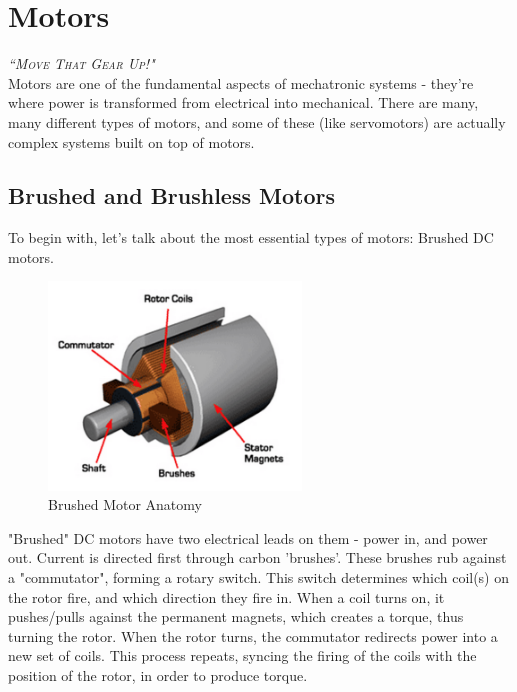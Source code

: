 \documentclass[10pt,letterpaper]{book}
\begin{document}
\chapter{Motors}
 {\slshape \scshape ``Move That Gear Up!"}
 \\
 
 Motors are one of the fundamental aspects of mechatronic systems - they're where power is transformed from electrical into mechanical. There are many, many different types of motors, and some of these (like servomotors) are actually complex systems built on top of motors.

\section{Brushed and Brushless Motors}

To begin with, let's talk about the most essential types of motors: Brushed DC motors.

\begin{figure}[H]\centering
\includegraphics[width=0.6\textwidth]{img_Mechatronics_Motors_brushed.png}
\caption{Brushed Motor Anatomy}
\end{figure}

"Brushed" DC motors have two electrical leads on them - power in, and power out. Current is directed first through carbon 'brushes'. These brushes rub against a "commutator", forming a rotary switch. This switch determines which coil(s) on the rotor fire, and which direction they fire in. When a coil turns on, it pushes/pulls against the permanent magnets, which creates a torque, thus turning the rotor. When the rotor turns, the commutator redirects power into a new set of coils. This process repeats, syncing the firing of the coils with the position of the rotor, in order to produce torque. 

\end{document}

